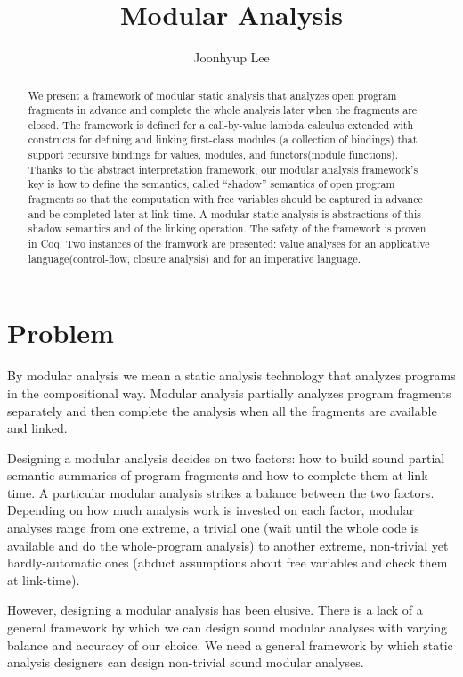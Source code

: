 \documentclass{article}
\title{Modular Analysis}
\author{Joonhyup Lee}
\begin{document}
\maketitle
\begin{abstract}
  We present a framework of modular static analysis that analyzes open
  program fragments in advance and complete the whole analysis later
  when the fragments are closed. The framework is defined for a
  call-by-value lambda calculus extended with constructs for defining and
  linking first-class modules (a collection of bindings) that support
  recursive bindings for values, modules, and functors(module
  functions). Thanks to the abstract interpretation framework, our
  modular analysis framework's key is how to define the semantics,
  called ``shadow'' semantics of open program fragments so that the
  computation with free variables should be captured in advance
  and be completed later at link-time. A modular
  static analysis is abstractions of this shadow semantics and of the
  linking operation. The safety of the framework is proven in Coq.
  Two instances of the framwork are presented: value analyses for an
  applicative language(control-flow, closure analysis) and for
  an imperative language.
\end{abstract}

\section{Problem}
By modular analysis we mean a static analysis technology that analyzes
programs in the compositional way. Modular analysis partially analyzes
program fragments separately and then complete the analysis when all
the fragments are available and linked.

Designing a modular analysis decides on two factors: how to build
sound partial semantic summaries of program fragments and how to
complete them at link time. A particular modular analysis strikes a
balance between the two factors. Depending on how much analysis work
is invested on each factor, modular analyses range from one extreme, a
trivial one (wait until the whole code is available and do the
whole-program analysis) to another extreme, non-trivial yet
hardly-automatic ones (abduct assumptions about free variables and
check them at link-time).

However, designing a modular analysis has been elusive. There is a
lack of a general framework by which we can design sound modular
analyses with varying balance and accuracy of our choice.
We need a general framework by which static analysis designers can
design non-trivial sound modular analyses.
\end{document}
